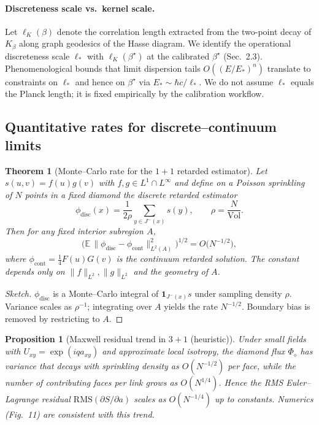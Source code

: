 \documentclass[12pt,a4paper]{article}
\newtheorem{proposition}{Proposition}
\newtheorem{theorem}{Theorem}
\begin{document}
\paragraph{Discreteness scale vs.\ kernel scale.}
Let $\ell_K(\beta)$ denote the correlation length extracted from the two-point decay of $K_\beta$ along
graph geodesics of the Hasse diagram. We identify the operational discreteness scale $\ell_\ast$ with
$\ell_K(\beta^\star)$ at the calibrated $\beta^\star$ (Sec.~2.3). Phenomenological bounds that limit dispersion
tails $O((E/E_\ast)^n)$ translate to constraints on $\ell_\ast$ and hence on $\beta^\star$ via $E_\ast\sim \hbar c/\ell_\ast$.
We do not assume $\ell_\ast$ equals the Planck length; it is fixed empirically by the calibration workflow.

\subsection*{Quantitative rates for discrete--continuum limits}
\label{subsec:quant_rates}

\begin{theorem}[Monte--Carlo rate for the $1{+}1$ retarded estimator]
\label{thm:green_rate_1p1}
Let $s(u,v)=f(u)g(v)$ with $f,g\in L^1\cap L^\infty$ and define on a Poisson sprinkling of $N$ points
in a fixed diamond the discrete retarded estimator
\[\phi_{\mathrm{disc}}(x)=\frac{1}{2\rho}\sum_{y\in J^-(x)} s(y),\qquad \rho=\frac{N}{\mathrm{Vol}}.\]
Then for any fixed interior subregion $A$,
\[\Big(\mathbb{E}\,\| \phi_{\mathrm{disc}}-\phi_{\mathrm{cont}} \|_{L^2(A)}^2\Big)^{1/2} = O\!\big(N^{-1/2}\big),\]
where $\phi_{\mathrm{cont}}=\tfrac14 F(u)G(v)$ is the continuum retarded solution. The constant depends only
on $\|f\|_{L^2},\|g\|_{L^2}$ and the geometry of $A$.
\end{theorem}

\begin{proof}[Sketch]
$\phi_{\mathrm{disc}}$ is a Monte--Carlo integral of $\mathbf{1}_{J^-(x)} s$ under sampling density $\rho$.
Variance scales as $\rho^{-1}$; integrating over $A$ yields the rate $N^{-1/2}$. Boundary bias is removed
by restricting to $A$.
\end{proof}

\begin{proposition}[Maxwell residual trend in $3{+}1$ (heuristic)]
Under small fields with $U_{xy}=\exp(iqa_{xy})$ and approximate local isotropy, the diamond flux
$\Phi_\diamond$ has variance that decays with sprinkling density as $O(N^{-1/2})$ per face, while the
number of contributing faces per link grows as $O(N^{1/4})$. Hence the RMS Euler--Lagrange residual
$\mathrm{RMS}(\partial S/\partial a)$ scales as $O(N^{-1/4})$ up to constants. Numerics (Fig.~11) are consistent
with this trend.
\end{proposition}
\end{document}
